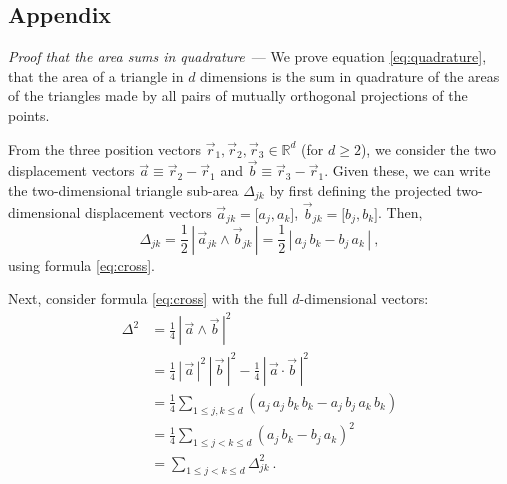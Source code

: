 \documentclass[10pt]{article}
\renewcommand{\paragraph}[1]{\par\addvspace{1em}\noindent\textsl{#1}~---}
\newcommand{\secbreak}{\bigskip{\centering\footnotesize%
\rotatebox[origin=c]{55}{$\triangle$}~~~%
\rotatebox[origin=c]{35}{$\triangle$}~~~%
\rotatebox[origin=c]{15}{$\triangle$}\par}\bigskip\noindent}
\newcommand{\abs}[1]{|\,{#1}\,|}
\begin{document}
\secbreak

\vspace{-\bigskipamount}
\renewcommand{\section}[2]{}%
{\small\singlespacing\par}

\secbreak
\appendix
\subsection{Appendix}
\label{sec:appendix}

\paragraph{Proof that the area sums in quadrature} We prove equation \eqref{eq:quadrature}, that the area of a triangle in $d$ dimensions is the sum in quadrature of the areas of the triangles made by all pairs of mutually orthogonal projections of the points.

From the three position vectors $\vec{r}_1, \vec{r}_2, \vec{r}_3 \in \mathbb{R}^d$ (for $d \geq 2$), we consider the two displacement vectors $\vec{a} \equiv \vec{r}_2 - \vec{r}_1$ and $\vec{b} \equiv \vec{r}_3 - \vec{r}_1$.
Given these, we can write the two-dimensional triangle sub-area $\Delta_{jk}$ by first defining the projected two-dimensional displacement vectors $\vec{a}_{jk} = \big[ a_j, a_k \big]$, $\vec{b}_{jk} = \big[ b_j, b_k \big]$. Then,
\begin{equation}
    \Delta_{jk}
    = \frac{1}{2} \, \abs{ \vec{a}_{jk} \wedge \vec{b}_{jk} }
    = \frac{1}{2}
        \, \abs{a_j \, b_k - b_j \, a_k}~,
\end{equation}
using formula \eqref{eq:cross}.

Next, consider formula \eqref{eq:cross} with the full $d$-dimensional vectors:
\begin{align}
    \Delta^2
    &= \frac{1}{4}\, \abs{\vec{a} \wedge \vec{b}}^2 \nonumber\\
    &= \frac{1}{4}\, \abs{\vec{a}}^2 \, \abs{\vec{b}}^2 - \frac{1}{4}\, \abs{\vec{a} \cdot \vec{b}}^2 \nonumber\\
    &= \frac{1}{4} \sum_{1 \leq j, k \leq d}
        ( a_j \, a_j \, b_k \, b_k - a_j \, b_j \, a_k \, b_k ) \nonumber\\
    &= \frac{1}{4} \sum_{1 \leq j < k \leq d}
        ( a_j \, b_k - b_j \, a_k )^2 \nonumber\\
    &= \sum_{1 \leq j < k \leq d} \Delta_{jk}^2~.
\end{align}
\end{document}
